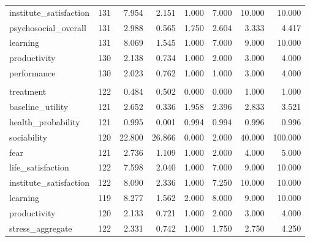 \begin{table}
\begin{tabular}[t]{lrrrrrrr}
\hspace{1em}institute\_satisfaction & 131 & 7.954 & 2.151 & 1.000 & 7.000 & 10.000 & 10.000\\
\hspace{1em}psychosocial\_overall & 131 & 2.988 & 0.565 & 1.750 & 2.604 & 3.333 & 4.417\\
\hspace{1em}learning & 131 & 8.069 & 1.545 & 1.000 & 7.000 & 9.000 & 10.000\\
\hspace{1em}productivity & 130 & 2.138 & 0.734 & 1.000 & 2.000 & 3.000 & 4.000\\
\hspace{1em}performance & 130 & 2.023 & 0.762 & 1.000 & 1.000 & 3.000 & 4.000\\
\addlinespace[0.3em]
\multicolumn{8}{l}{\textbf{Endline}}\\
\hspace{1em}treatment & 122 & 0.484 & 0.502 & 0.000 & 0.000 & 1.000 & 1.000\\
\hspace{1em}baseline\_utility & 121 & 2.652 & 0.336 & 1.958 & 2.396 & 2.833 & 3.521\\
\hspace{1em}health\_probability & 121 & 0.995 & 0.001 & 0.994 & 0.994 & 0.996 & 0.996\\
\hspace{1em}sociability & 120 & 22.800 & 26.866 & 0.000 & 2.000 & 40.000 & 100.000\\
\hspace{1em}fear & 121 & 2.736 & 1.109 & 1.000 & 2.000 & 4.000 & 5.000\\
\hspace{1em}life\_satisfaction & 122 & 7.598 & 2.040 & 1.000 & 7.000 & 9.000 & 10.000\\
\hspace{1em}institute\_satisfaction & 122 & 8.090 & 2.336 & 1.000 & 7.250 & 10.000 & 10.000\\
\hspace{1em}learning & 119 & 8.277 & 1.562 & 2.000 & 8.000 & 9.000 & 10.000\\
\hspace{1em}productivity & 120 & 2.133 & 0.721 & 1.000 & 2.000 & 3.000 & 4.000\\
\hspace{1em}stress\_aggregate & 122 & 2.331 & 0.742 & 1.000 & 1.750 & 2.750 & 4.250\\
\bottomrule
\end{tabular}
\end{table}
